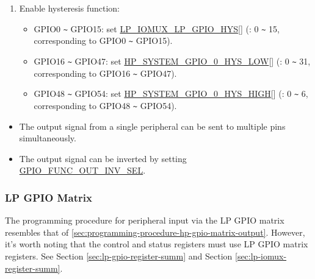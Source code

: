 \documentclass[main\_\_EN.tex]{subfiles}
\begin{document}
\begin{enumerate}
\begin{itemize}
        \item Set the \hyperref[fielddesc:IOMUXGPIONFUNDRV]{IO\_MUX\_GPIO\_FUN\_DRV} field to the desired value for output strength (0 \verb+~+ 3). The higher the drive strength, the more current can be sourced/sunk from the pin.
        \item If using open drain mode, set/clear the \hyperref[fielddesc:IOMUXGPIONFUNWPU]{IO\_MUX\_GPIO\_FUN\_WPU} and \hyperref[fielddesc:IOMUXGPIONFUNWPD]{IO\_MUX\_GPIO\_FUN\_WPD} bits to enable/disable the internal pull-up/pull-down resistors.
    \end{itemize}
    \item Enable hysteresis function:
    \begin{itemize}
        \item GPIO0 \verb+~+ GPIO15: set \hyperref[fielddesc:LPIOMUXLPGPIOHYS]{LP\_IOMUX\_LP\_GPIO\_HYS}[] (: 0 \verb+~+ 15, corresponding to GPIO0 \verb+~+ GPIO15).
        \item GPIO16 \verb+~+ GPIO47: set \hyperref[fielddesc:HPSYSTEMGPIO0HYSLOW]{HP\_SYSTEM\_GPIO\_0\_HYS\_LOW}[] (: 0 \verb+~+ 31, corresponding to GPIO16 \verb+~+ GPIO47).
        \item GPIO48 \verb+~+ GPIO54: set \hyperref[fielddesc:HPSYSTEMGPIO0HYSHIGH]{HP\_SYSTEM\_GPIO\_0\_HYS\_HIGH}[] (: 0 \verb+~+ 6, corresponding to GPIO48 \verb+~+ GPIO54).
    \end{itemize}
\end{enumerate}

\begin{tiplisting}
\vspace{-2em}
\begin{itemize}
\item The output signal from a single peripheral can be sent to multiple pins simultaneously.
\item The output signal can be inverted by setting \hyperref[fielddesc:GPIOFUNCNOUTINVSEL]{GPIO\_FUNC\_OUT\_INV\_SEL}.
\end{itemize}
\end{tiplisting}

\subsubsection{LP GPIO Matrix}

The programming procedure for peripheral input via the LP GPIO matrix resembles that of \ref{sec:programming-procedure-hp-gpio-matrix-output}. However, it's worth noting that the control and status registers must use LP GPIO matrix registers. See Section \ref{sec:lp-gpio-register-summ} and Section \ref{sec:lp-iomux-register-summ}.
\end{document}
